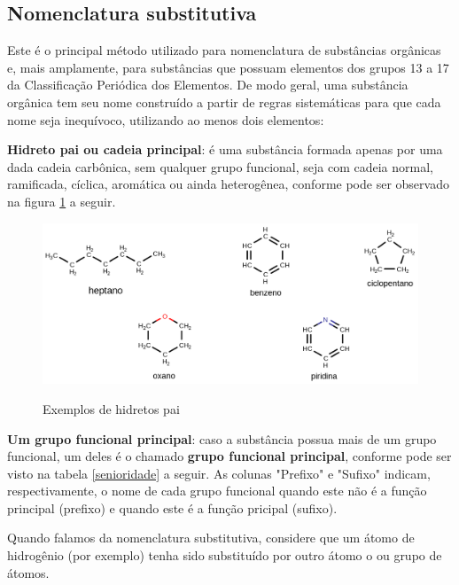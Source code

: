 \documentclass[a4paper,12pt]{book}
\begin{document}
\subsection{Nomenclatura substitutiva}
Este é o principal método utilizado para nomenclatura de substâncias orgânicas e, mais amplamente, para substâncias que possuam elementos dos grupos 13 a 17 da Classificação Periódica dos Elementos. De modo geral, uma substância orgânica tem seu nome construído a partir de regras sistemáticas para que cada nome seja inequívoco, utilizando ao menos dois elementos:

\begin{description}
	\item \textbf{Hidreto pai ou cadeia principal}: é uma substância formada apenas por uma dada cadeia carbônica, sem qualquer grupo funcional, seja com cadeia normal, ramificada, cíclica, aromática ou ainda heterogênea, conforme pode ser observado na figura \ref{fig:hp} a seguir.
	
	\begin{figure}[h]
		\centering
		\caption{Exemplos de hidretos pai}
		\vspace{0.5cm}
		\includegraphics[width=1\linewidth]{imagens/hidretos_pai.png}
	\label{fig:hp}
	\end{figure}

	\item \textbf{Um grupo funcional principal}: caso a substância possua mais de um grupo funcional, um deles é o chamado \textbf{grupo funcional principal}, conforme pode ser visto na tabela \ref{senioridade} a seguir. As colunas "Prefixo" e "Sufixo" indicam, respectivamente, o nome de cada grupo funcional quando este não é a função principal (prefixo) e quando este é a função pricipal (sufixo).
\end{description}

Quando falamos da nomenclatura substitutiva, considere que um átomo de hidrogênio (por exemplo) tenha sido substituído por outro átomo o ou grupo de átomos.
\end{document}
